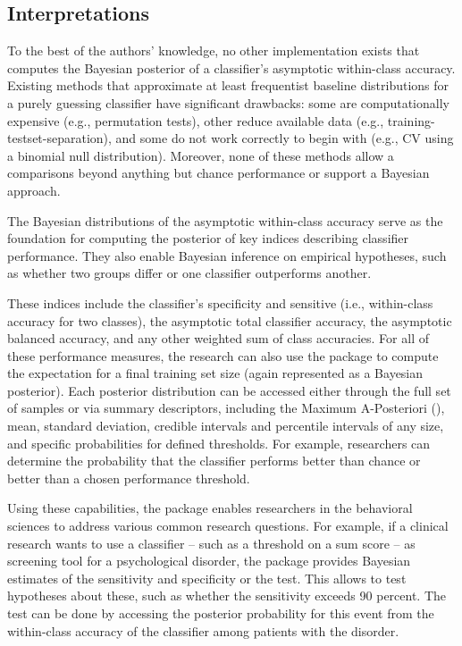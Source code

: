 \documentclass[article]{jss}
\begin{document}
\subsection{Interpretations} \label{sec:interpretations}
To the best of the authors’ knowledge, no other implementation exists that computes the Bayesian posterior of a classifier’s asymptotic within-class accuracy. Existing methods that approximate at least frequentist baseline distributions for a purely guessing classifier have significant drawbacks: some are computationally expensive (e.g., permutation tests), other reduce available data (e.g., training-testset-separation), and some do not work correctly to begin with (e.g., CV using a binomial null distribution). Moreover, none of these methods allow a comparisons beyond anything but chance performance or support a Bayesian approach.

The Bayesian distributions of the asymptotic within-class accuracy serve as the foundation for computing the posterior of key indices describing classifier performance. They also enable Bayesian inference on empirical hypotheses, such as whether two groups differ or one classifier outperforms another.

These indices include the classifier’s specificity and sensitive (i.e., within-class accuracy for two classes), the asymptotic total classifier accuracy, the asymptotic balanced accuracy, and any other weighted sum of class accuracies. For all of these performance measures, the research can also use the package to compute the expectation for a final training set size (again represented as a Bayesian posterior). Each posterior distribution can be accessed either through the full set of samples or via summary descriptors, including the Maximum A-Posteriori (), mean, standard deviation, credible intervals and percentile intervals of any size, and specific probabilities for defined thresholds. For example, researchers can determine the probability that the classifier performs better than chance or better than a chosen performance threshold.

Using these capabilities, the package enables researchers in the behavioral sciences to address various common research questions. For example, if a clinical research wants to use a classifier – such as a threshold on a sum score – as screening tool for a psychological disorder, the package provides Bayesian estimates of the sensitivity and specificity or the test. This allows to test hypotheses about these, such as whether the sensitivity exceeds 90 percent. The test can be done by accessing the posterior probability for this event from the within-class accuracy of the classifier among patients with the disorder.
\end{document}
